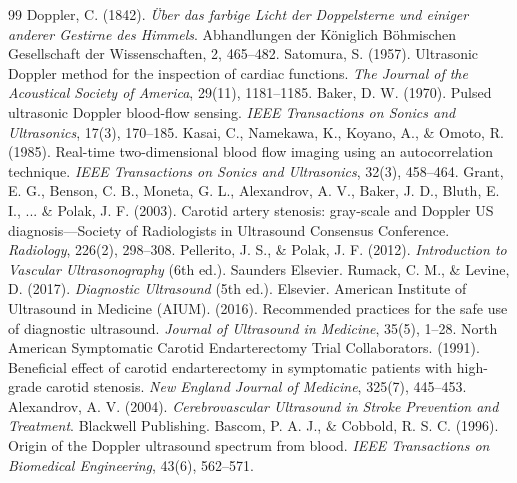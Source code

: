 \documentclass[11pt,a4paper]{article}
\begin{document}
\begin{thebibliography}{99}
 Doppler, C. (1842). \textit{Über das farbige Licht der Doppelsterne und einiger anderer Gestirne des Himmels}. Abhandlungen der Königlich Böhmischen Gesellschaft der Wissenschaften, 2, 465--482.
 Satomura, S. (1957). Ultrasonic Doppler method for the inspection of cardiac functions. \textit{The Journal of the Acoustical Society of America}, 29(11), 1181--1185.
 Baker, D. W. (1970). Pulsed ultrasonic Doppler blood-flow sensing. \textit{IEEE Transactions on Sonics and Ultrasonics}, 17(3), 170--185.
 Kasai, C., Namekawa, K., Koyano, A., \& Omoto, R. (1985). Real-time two-dimensional blood flow imaging using an autocorrelation technique. \textit{IEEE Transactions on Sonics and Ultrasonics}, 32(3), 458--464.
 Grant, E. G., Benson, C. B., Moneta, G. L., Alexandrov, A. V., Baker, J. D., Bluth, E. I., ... \& Polak, J. F. (2003). Carotid artery stenosis: gray-scale and Doppler US diagnosis—Society of Radiologists in Ultrasound Consensus Conference. \textit{Radiology}, 226(2), 298--308.
 Pellerito, J. S., \& Polak, J. F. (2012). \textit{Introduction to Vascular Ultrasonography} (6th ed.). Saunders Elsevier.
 Rumack, C. M., \& Levine, D. (2017). \textit{Diagnostic Ultrasound} (5th ed.). Elsevier.
 American Institute of Ultrasound in Medicine (AIUM). (2016). Recommended practices for the safe use of diagnostic ultrasound. \textit{Journal of Ultrasound in Medicine}, 35(5), 1--28.
 North American Symptomatic Carotid Endarterectomy Trial Collaborators. (1991). Beneficial effect of carotid endarterectomy in symptomatic patients with high-grade carotid stenosis. \textit{New England Journal of Medicine}, 325(7), 445--453.
 Alexandrov, A. V. (2004). \textit{Cerebrovascular Ultrasound in Stroke Prevention and Treatment}. Blackwell Publishing.
 Bascom, P. A. J., \& Cobbold, R. S. C. (1996). Origin of the Doppler ultrasound spectrum from blood. \textit{IEEE Transactions on Biomedical Engineering}, 43(6), 562--571.
\end{thebibliography}
\end{document}
